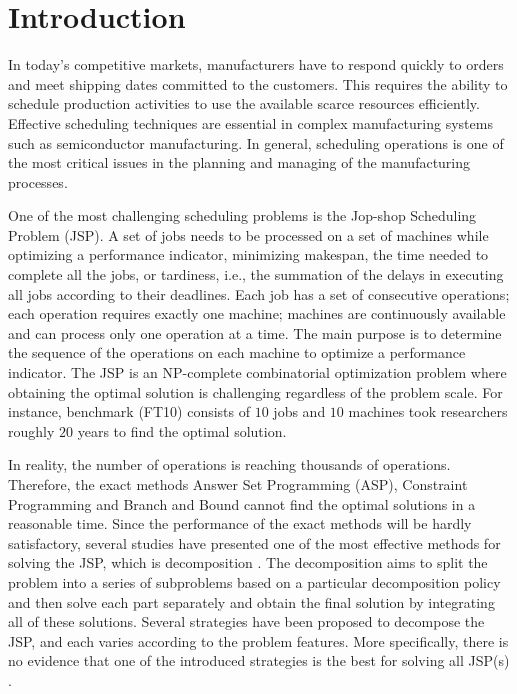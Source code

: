 \documentclass[runningheads]{llncs}
\begin{document}
\section{Introduction}
In today's competitive markets, manufacturers have to respond quickly to orders and meet shipping dates committed to the customers. This requires the ability to schedule production activities to use the available scarce resources efficiently. Effective scheduling techniques are essential in complex manufacturing systems such as semiconductor manufacturing. In general, scheduling operations is one of the most critical issues in the planning and managing of the manufacturing processes\cite{uzsoy2000performance}. 

One of the most challenging scheduling problems is the Jop-shop Scheduling Problem (JSP). A set of jobs needs to be processed on a set of machines while optimizing a performance indicator, minimizing makespan, the time needed to complete all the jobs, or tardiness, i.e., the summation of the delays in executing all jobs according to their deadlines. Each job has a set of consecutive operations; each operation requires exactly one machine; machines are continuously available and can process only one operation at a time. The main purpose is to determine the sequence of the operations on each machine to optimize a performance indicator. The JSP is an NP-complete combinatorial optimization problem where obtaining the optimal solution is challenging regardless of the problem scale\cite{garey1976complexity,lenstra1977complexity,liu2008prediction}. For instance, benchmark (FT10) consists of $10$ jobs and $10$ machines took researchers roughly $20$ years to find the optimal solution\cite{adams1988shifting,zhang2010hybrid}.

In reality, the number of operations is reaching thousands of operations. Therefore, the exact methods Answer Set Programming (ASP), Constraint Programming and Branch and Bound cannot find the optimal solutions in a reasonable time\cite{daneshamooz2021mathematical,shi2021solving,francescutto2021solving}. Since the performance of the exact methods will be hardly satisfactory, several studies have presented one of the most effective methods for solving the JSP, which is decomposition \cite{zhang2010hybrid}. The decomposition aims to split the problem into a series of subproblems based on a particular decomposition policy and then solve each part separately and obtain the final solution by integrating all of these solutions. Several strategies have been proposed to decompose the JSP, and each varies according to the problem features. More specifically, there is no evidence that one of the introduced strategies is the best for solving all JSP(s) \cite{ovacik2012decomposition}. 
\end{document}
